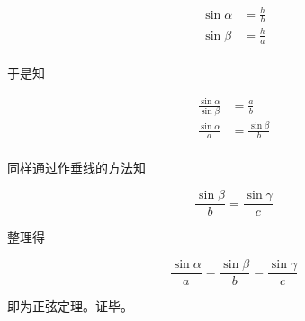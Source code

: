 \begin{align*}
  \sin\alpha &= \frac hb \\
  \sin\beta &= \frac ha \\
\end{align*}

于是知

\begin{align*}
  \frac{\sin\alpha}{\sin\beta} &= \frac ab \\
  \frac{\sin\alpha}a &= \frac{\sin\beta}b \\
\end{align*}

同样通过作垂线的方法知

\[ \frac{\sin\beta}b = \frac{\sin\gamma}c \]

整理得

\[ \frac{\sin\alpha}a = \frac{\sin\beta}b = \frac{\sin\gamma}c \]

即为正弦定理。证毕。
